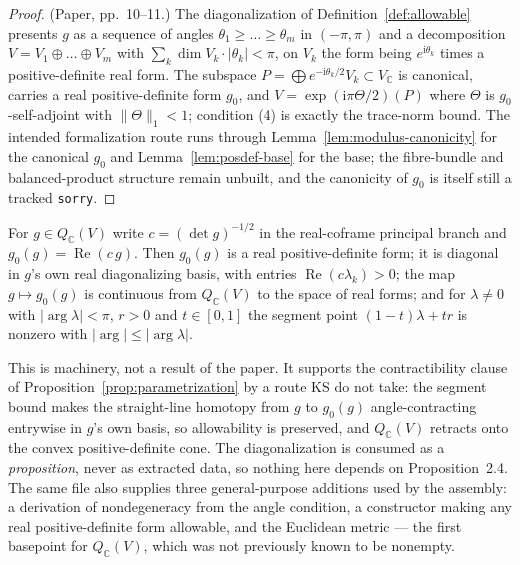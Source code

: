 \begin{proof}
  \notready
  (Paper, pp.~10--11.) The diagonalization of
  Definition~\ref{def:allowable} presents $g$ as a sequence of angles
  $\theta_1 \geq \dots \geq \theta_m$ in $(-\pi,\pi)$ and a decomposition
  $V = V_1 \oplus \dots \oplus V_m$ with
  $\sum_k \dim V_k \cdot |\theta_k| < \pi$, on $V_k$ the form being
  $e^{\mathrm i \theta_k}$ times a positive-definite real form. The subspace
  $P = \bigoplus e^{-\mathrm i \theta_k/2} V_k \subset V_{\mathbb C}$ is
  canonical, carries a real positive-definite form $g_0$, and
  $V = \exp(\mathrm i \pi \Theta/2)(P)$ where $\Theta$ is $g_0$-self-adjoint
  with $\|\Theta\|_1 < 1$; condition (4) is exactly the trace-norm bound.
  The intended formalization route runs through Lemma~\ref{lem:modulus-canonicity} for the
  canonical $g_0$ and Lemma~\ref{lem:posdef-base} for the base; the fibre-bundle and
  balanced-product structure remain unbuilt, and the canonicity of $g_0$ is itself still
  a tracked \texttt{sorry}.
\end{proof}

\begin{lemma}
  \label{lem:posdef-retraction}
  \leanok
  For $g \in Q_{\mathbb C}(V)$ write $c = (\det g)^{-1/2}$ in the real-coframe principal
  branch and $g_0(g) = \operatorname{Re}(c\,g)$. Then $g_0(g)$ is a real
  positive-definite form; it is diagonal in $g$'s own real diagonalizing basis, with
  entries $\operatorname{Re}(c\lambda_k) > 0$; the map $g \mapsto g_0(g)$ is continuous
  from $Q_{\mathbb C}(V)$ to the space of real forms; and for $\lambda \neq 0$ with
  $|\arg\lambda| < \pi$, $r > 0$ and $t \in [0,1]$ the segment point
  $(1-t)\lambda + tr$ is nonzero with $|\arg| \leq |\arg\lambda|$.

  This is machinery, not a result of the paper. It supports the contractibility clause of
  Proposition~\ref{prop:parametrization} by a route KS do not take: the segment bound makes
  the straight-line homotopy from $g$ to $g_0(g)$ angle-contracting entrywise in $g$'s own
  basis, so allowability is preserved, and $Q_{\mathbb C}(V)$ retracts onto the convex
  positive-definite cone. The diagonalization is consumed as a \emph{proposition}, never as
  extracted data, so nothing here depends on Proposition~2.4.
  The same file also supplies three general-purpose additions used by the assembly: a
  derivation of nondegeneracy from the angle condition, a constructor making any real
  positive-definite form allowable, and the Euclidean metric --- the first basepoint for
  $Q_{\mathbb C}(V)$, which was not previously known to be nonempty.
\end{lemma}

